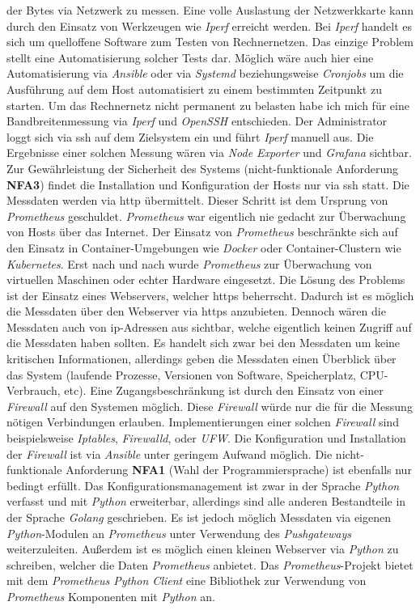 \documentclass[titlepage]{report}
\begin{document}
der Bytes via Netzwerk zu messen\cite{HEISENODE}. Eine volle Auslastung
der Netzwerkkarte kann durch den Einsatz von Werkzeugen wie \emph{Iperf}
erreicht werden. Bei \emph{Iperf} handelt es sich um quelloffene
Software zum Testen von Rechnernetzen\cite{IPERF}. Das einzige Problem
stellt eine Automatisierung solcher Tests dar. Möglich wäre auch hier
eine Automatisierung via \emph{Ansible} oder via \emph{Systemd}
beziehungsweise \emph{Cronjobs} um die Ausführung auf dem Host
automatisiert zu einem bestimmten Zeitpunkt zu starten. Um das
Rechnernetz nicht permanent zu belasten habe ich mich für eine
Bandbreitenmessung via \emph{Iperf} und \emph{OpenSSH} entschieden. Der
Administrator loggt sich via \gls{ssh} auf dem Zielsystem ein und führt
\emph{Iperf} manuell aus. Die Ergebnisse einer solchen Messung wären via
\emph{Node Exporter} und \emph{Grafana} sichtbar. Zur Gewährleistung der
Sicherheit des Systems (nicht\hyp{}funktionale Anforderung
\textbf{NFA3}) findet die Installation und Konfiguration der Hosts nur
via \gls{ssh} statt. Die Messdaten werden via \gls{http}
übermittelt. Dieser Schritt ist dem Ursprung von \emph{Prometheus}
geschuldet. \emph{Prometheus} war eigentlich nie gedacht zur Überwachung
von Hosts über das Internet. Der Einsatz von \emph{Prometheus}
beschränkte sich auf den Einsatz in Container\hyp{}Umgebungen wie
\emph{Docker} oder Container\hyp{}Clustern wie \emph{Kubernetes}. Erst
nach und nach wurde \emph{Prometheus} zur Überwachung von virtuellen
Maschinen oder echter Hardware eingesetzt. Die Lösung des Problems ist
der Einsatz eines Webservers, welcher \gls{https} beherrscht. Dadurch
ist es möglich die Messdaten über den Webserver via \gls{https}
anzubieten. Dennoch wären die Messdaten auch von \gls{ip}\hyp{}Adressen
aus sichtbar, welche eigentlich keinen Zugriff auf die Messdaten haben
sollten. Es handelt sich zwar bei den Messdaten um keine kritischen
Informationen, allerdings geben die Messdaten einen Überblick über das
System (laufende Prozesse, Versionen von Software, Speicherplatz,
CPU\hyp{}Verbrauch, etc). Eine Zugangsbeschränkung ist durch den Einsatz
von einer \emph{Firewall} auf den Systemen möglich. Diese
\emph{Firewall} würde nur die für die Messung nötigen Verbindungen
erlauben. Implementierungen einer solchen \emph{Firewall} sind
beispielsweise \emph{Iptables}, \emph{Firewalld}, oder \emph{UFW}. Die
Konfiguration und Installation der \emph{Firewall} ist via
\emph{Ansible} unter geringem Aufwand möglich. Die
nicht\hyp{}funktionale Anforderung \textbf{NFA1} (Wahl der
Programmiersprache) ist ebenfalls nur bedingt erfüllt. Das
Konfigurationsmanagement ist zwar in der Sprache \emph{Python} verfasst
und mit \emph{Python} erweiterbar, allerdings sind alle anderen
Bestandteile in der Sprache \emph{Golang} geschrieben. Es ist jedoch
möglich Messdaten via eigenen \emph{Python}\hyp{}Modulen an
\emph{Prometheus} unter Verwendung des \emph{Pushgateways}
weiterzuleiten. Außerdem ist es möglich einen kleinen Webserver via
\emph{Python} zu schreiben, welcher die Daten \emph{Prometheus}
anbietet. Das \emph{Prometheus}\hyp{}Projekt bietet mit dem
\emph{Prometheus Python Client} eine Bibliothek zur Verwendung von
\emph{Prometheus} Komponenten mit \emph{Python}
an\cite{PROMETHEUSPYTHON}.
\end{document}

